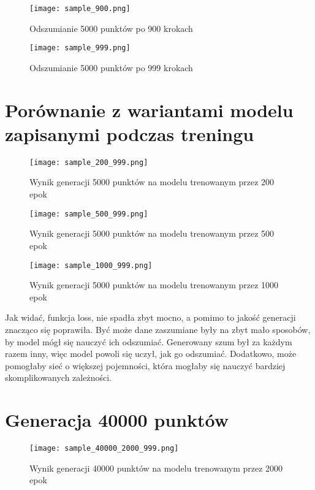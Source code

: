 \documentclass[a4paper]{article}
\begin{document}
\begin{figure}[H]
    \centering
    \texttt{[image: sample\_900.png]}
    \caption{Odszumianie 5000 punktów po 900 krokach}
    \label{fig:sample_900}
\end{figure}

\begin{figure}[H]
    \centering
    \texttt{[image: sample\_999.png]}
    \caption{Odszumianie 5000 punktów po 999 krokach}
    \label{fig:sample_999}
\end{figure}



\section{Porównanie z wariantami modelu zapisanymi podczas treningu}


\begin{figure}[H]
    \centering
    \texttt{[image: sample\_200\_999.png]}
    \caption{Wynik generacji 5000 punktów na modelu trenowanym przez 200 epok}
    \label{fig:sample_200_999}
\end{figure}

\begin{figure}[H]
    \centering
    \texttt{[image: sample\_500\_999.png]}
    \caption{Wynik generacji 5000 punktów na modelu trenowanym przez 500 epok}
    \label{fig:sample_500_999}
\end{figure}

\begin{figure}[H]
    \centering
    \texttt{[image: sample\_1000\_999.png]}
    \caption{Wynik generacji 5000 punktów na modelu trenowanym przez 1000 epok}
    \label{fig:sample_1000_999}
\end{figure}

Jak widać, funkcja loss, nie spadła zbyt mocno, a pomimo to jakość generacji znacząco się poprawiła.
Być może dane zaszumiane były na zbyt mało sposobów, by model mógł się nauczyć ich odszumiać.
Generowany szum był za każdym razem inny, więc model powoli się uczył, jak go odszumiać.
Dodatkowo, może pomogłaby sieć o większej pojemności, która mogłaby się nauczyć bardziej skomplikowanych
zależności.

\section{Generacja 40000 punktów}

\begin{figure}[H]
    \centering
    \texttt{[image: sample\_40000\_2000\_999.png]}
    \caption{Wynik generacji 40000 punktów na modelu trenowanym przez 2000 epok}
    \label{fig:sample_2000_999}
\end{figure}
\end{document}
